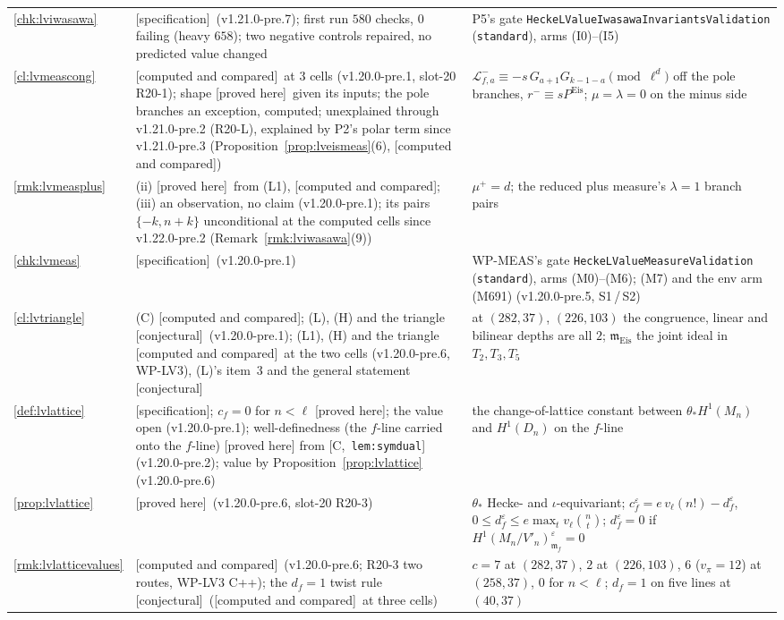 \documentclass[11pt]{article}
\theoremstyle{remark}
\newcommand{\m}{\mathfrak{m}}
\newcommand{\Mn}{M_n}
\newcommand{\Dn}{D_n}
\newcommand{\HA}[1]{[C,~\texttt{#1}]}      %
\newcommand{\PROVED}{\textsf{[proved here]}}
\newcommand{\CONJ}{\textsf{[conjectural]}}
\newcommand{\CMPD}{\textsf{[computed and compared]}}   %
\newcommand{\SPEC}{\textsf{[specification]}}           %
\begin{document}
\begin{center}
\begin{longtable}{@{}l>{\raggedright\arraybackslash}p{3.6cm}>{\raggedright\arraybackslash}p{10.6cm}@{}}
\ref{chk:lviwasawa} & \SPEC\ (v1.21.0-pre.7); first run $580$ checks, $0$ failing (heavy $658$); two negative controls repaired, no predicted value changed & P5's gate \texttt{HeckeLValueIwasawaInvariantsValidation} (\texttt{standard}), arms (I0)--(I5) \\
\ref{cl:lvmeascong} & \CMPD\ at $3$ cells (v1.20.0-pre.1, slot-20 R20-1); shape \PROVED\ given its inputs; the pole branches an exception, computed; unexplained through v1.21.0-pre.2 (R20-L), explained by P2's polar term since v1.21.0-pre.3 (Proposition~\ref{prop:lveismeas}(6), \CMPD) & $\mathcal L^{-}_{f,a}\equiv-s\,G_{a+1}G_{k-1-a}\pmod{\ell^{d}}$ off the pole branches, $r^{-}\equiv sP^{\mathrm{Eis}}$; $\mu=\lambda=0$ on the minus side \\
\ref{rmk:lvmeasplus} & (ii) \PROVED\ from (L1), \CMPD; (iii) an observation, no claim (v1.20.0-pre.1); its pairs $\{-k,n+k\}$ unconditional at the computed cells since v1.22.0-pre.2 (Remark~\ref{rmk:lviwasawa}(9)) & $\mu^{+}=d$; the reduced plus measure's $\lambda=1$ branch pairs \\
\ref{chk:lvmeas} & \SPEC\ (v1.20.0-pre.1) & WP-MEAS's gate \texttt{HeckeLValueMeasureValidation} (\texttt{standard}), arms (M0)--(M6); (M7) and the env arm (M691) (v1.20.0-pre.5, S1\,/\,S2) \\
\ref{cl:lvtriangle} & (C) \CMPD; (L), (H) and the triangle \CONJ\ (v1.20.0-pre.1); (L1), (H) and the triangle \CMPD\ at the two cells (v1.20.0-pre.6, WP-LV3), (L)'s item~3 and the general statement \CONJ & at $(282,37)$, $(226,103)$ the congruence, linear and bilinear depths are all $2$; $\m_{\mathrm{Eis}}$ the joint ideal in $T_2,T_3,T_5$ \\
\ref{def:lvlattice} & \SPEC; $c_f=0$ for $n<\ell$ \PROVED; the value open (v1.20.0-pre.1); well-definedness (the $f$-line carried onto the $f$-line) \PROVED{} from \HA{lem:symdual} (v1.20.0-pre.2); value by Proposition~\ref{prop:lvlattice} (v1.20.0-pre.6) & the change-of-lattice constant between $\theta_\ast H^{1}(\Mn)$ and $H^{1}(\Dn)$ on the $f$-line \\
\ref{prop:lvlattice} & \PROVED\ (v1.20.0-pre.6, slot-20 R20-3) & $\theta_\ast$ Hecke- and $\iota$-equivariant; $c_f^{\varepsilon}=e\,v_\ell(n!)-d_f^{\varepsilon}$, $0\le d_f^{\varepsilon}\le e\max_tv_\ell\binom nt$; $d_f^{\varepsilon}=0$ if $H^{1}(\Mn/V'_n)^{\varepsilon}_{\m_f}=0$ \\
\ref{rmk:lvlatticevalues} & \CMPD\ (v1.20.0-pre.6; R20-3 two routes, WP-LV3 C++); the $d_f=1$ twist rule \CONJ\ (\CMPD\ at three cells) & $c=7$ at $(282,37)$, $2$ at $(226,103)$, $6$ ($v_\pi=12$) at $(258,37)$, $0$ for $n<\ell$; $d_f=1$ on five lines at $(40,37)$ \\

\end{longtable}
\end{center}
\end{document}

